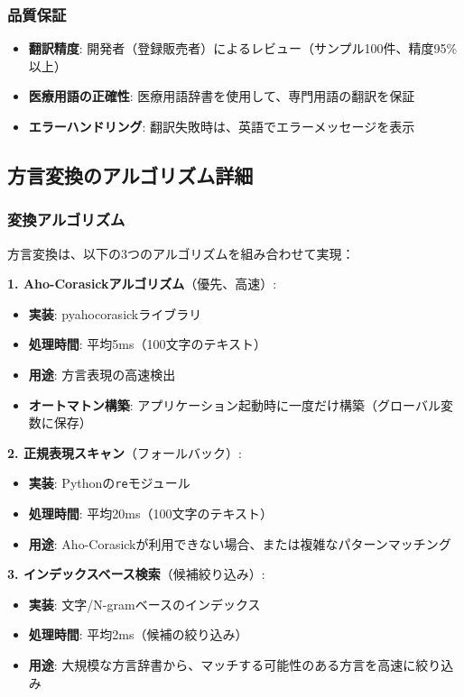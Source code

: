 \documentclass[a4paper,11pt,ja=standard,xelatex]{bxjsarticle}
\theoremstyle{definition}
\begin{document}
\subsubsection{品質保証}

\begin{itemize}
\item \textbf{翻訳精度}: 開発者（登録販売者）によるレビュー（サンプル100件、精度95\%以上）
\item \textbf{医療用語の正確性}: 医療用語辞書を使用して、専門用語の翻訳を保証
\item \textbf{エラーハンドリング}: 翻訳失敗時は、英語でエラーメッセージを表示
\end{itemize}

\subsection{方言変換のアルゴリズム詳細}

\subsubsection{変換アルゴリズム}

方言変換は、以下の3つのアルゴリズムを組み合わせて実現：

\textbf{1. Aho-Corasickアルゴリズム}（優先、高速）:
\begin{itemize}
\item \textbf{実装}: pyahocorasickライブラリ
\item \textbf{処理時間}: 平均5ms（100文字のテキスト）
\item \textbf{用途}: 方言表現の高速検出
\item \textbf{オートマトン構築}: アプリケーション起動時に一度だけ構築（グローバル変数に保存）
\end{itemize}

\textbf{2. 正規表現スキャン}（フォールバック）:
\begin{itemize}
\item \textbf{実装}: Pythonの\texttt{re}モジュール
\item \textbf{処理時間}: 平均20ms（100文字のテキスト）
\item \textbf{用途}: Aho-Corasickが利用できない場合、または複雑なパターンマッチング
\end{itemize}

\textbf{3. インデックスベース検索}（候補絞り込み）:
\begin{itemize}
\item \textbf{実装}: 文字/N-gramベースのインデックス
\item \textbf{処理時間}: 平均2ms（候補の絞り込み）
\item \textbf{用途}: 大規模な方言辞書から、マッチする可能性のある方言を高速に絞り込み
\end{itemize}
\end{document}
